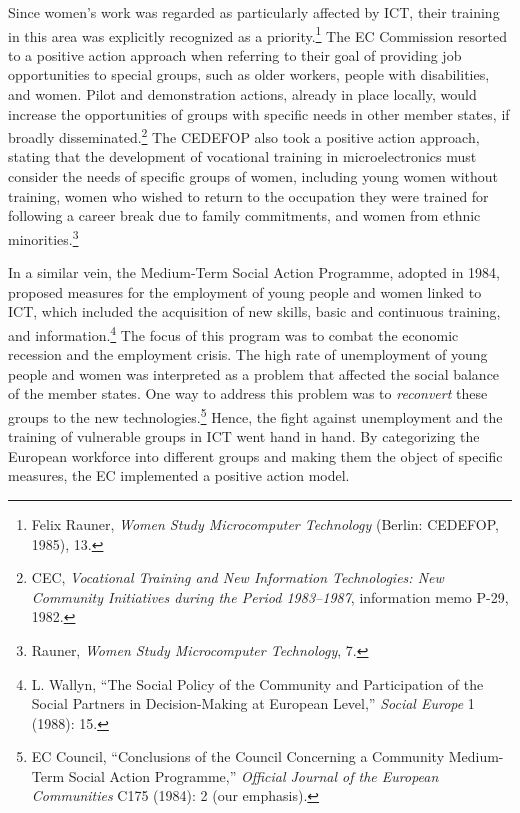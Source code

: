 \documentclass{tufte-handout}
\begin{document}
Since women's work was regarded as particularly affected by ICT, their
training in this area was explicitly recognized as a
priority.\footnote{Felix Rauner, \emph{Women Study Microcomputer
  Technology} (Berlin: CEDEFOP, 1985), 13.} The EC Commission resorted
to a positive action approach when referring to their goal of providing
job opportunities to special groups, such as older workers, people with
disabilities, and women. Pilot and demonstration actions, already in
place locally, would increase the opportunities of groups with specific
needs in other member states, if broadly disseminated.\footnote{CEC,
  \emph{Vocational Training and New Information Technologies: New
  Community Initiatives during the Period 1983--1987}, information memo
  P-29, 1982.} The CEDEFOP also took a positive action approach, stating
that the development of vocational training in microelectronics must
consider the needs of specific groups of women, including young women
without training, women who wished to return to the occupation they were
trained for following a career break due to family commitments, and
women from ethnic minorities.\footnote{Rauner, \emph{Women Study
  Microcomputer Technology}, 7.}

In a similar vein, the Medium-Term Social Action Programme, adopted in
1984, proposed measures for the employment of young people and women
linked to ICT, which included the acquisition of new skills, basic and
continuous training, and information.\footnote{L. Wallyn, ``The Social
  Policy of the Community and Participation of the Social Partners in
  Decision-Making at European Level,'' \emph{Social Europe} 1 (1988):
  15.} The focus of this program was to combat the economic recession
and the employment crisis. The high rate of unemployment of young people
and women was interpreted as a problem that affected the social balance
of the member states. One way to address this problem was to
\emph{reconvert} these groups to the new technologies.\footnote{EC
  Council, ``Conclusions of the Council Concerning a Community
  Medium-Term Social Action Programme,'' \emph{Official Journal of the
  European Communities} C175 (1984): 2 (our emphasis).} Hence, the fight
against unemployment and the training of vulnerable groups in ICT went
hand in hand. By categorizing the European workforce into different
groups and making them the object of specific measures, the EC
implemented a positive action model.
\end{document}
